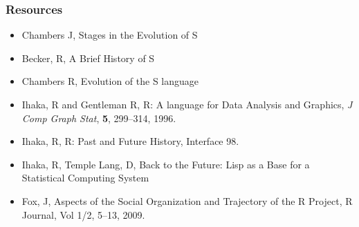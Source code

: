 \documentclass[svgnames, aspectratio=169]{beamer}
\begin{document}
\begin{frame}
  \frametitle{Resources}

  \begin{itemize}
  \item Chambers J, Stages in the Evolution of S
  \item Becker, R, A Brief History of S
  \item Chambers R, Evolution of the S language
  \item Ihaka, R and Gentleman R, R: A language for Data Analysis and Graphics,
    {\em J Comp Graph Stat}, {\bf 5}, 299--314, 1996.
  \item Ihaka, R, R: Past and Future History, Interface 98.
  \item Ihaka, R, Temple Lang, D, Back to the Future: Lisp as a Base for a
    Statistical Computing System
  \item Fox, J, Aspects of the Social Organization and Trajectory of
    the R Project, R Journal, Vol 1/2, 5--13, 2009.
  \end{itemize}

\end{frame}
\end{document}
